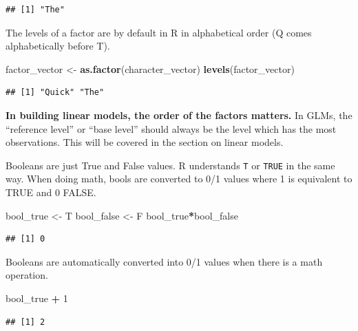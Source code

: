 \documentclass[]{book}
\newenvironment{Shaded}{\begin{snugshade}}{\end{snugshade}}
\newcommand{\DecValTok}[1]{\textcolor[rgb]{0.00,0.00,0.81}{#1}}
\newcommand{\KeywordTok}[1]{\textcolor[rgb]{0.13,0.29,0.53}{\textbf{#1}}}
\newcommand{\NormalTok}[1]{#1}
\newcommand{\OperatorTok}[1]{\textcolor[rgb]{0.81,0.36,0.00}{\textbf{#1}}}
\newcommand{\StringTok}[1]{\textcolor[rgb]{0.31,0.60,0.02}{#1}}
\begin{document}
\begin{verbatim}
## [1] "The"
\end{verbatim}

The levels of a factor are by default in R in alphabetical order (Q comes alphabetically before T).

\begin{Shaded}
\begin{Highlighting}[]
\NormalTok{factor_vector <-}\StringTok{ }\KeywordTok{as.factor}\NormalTok{(character_vector)}
\KeywordTok{levels}\NormalTok{(factor_vector)}
\end{Highlighting}
\end{Shaded}

\begin{verbatim}
## [1] "Quick" "The"
\end{verbatim}

\textbf{In building linear models, the order of the factors matters.} In GLMs, the ``reference level'' or ``base level'' should always be the level which has the most observations. This will be covered in the section on linear models.

Booleans are just True and False values. R understands \texttt{T} or \texttt{TRUE} in the same way. When doing math, bools are converted to 0/1 values where 1 is equivalent to TRUE and 0 FALSE.

\begin{Shaded}
\begin{Highlighting}[]
\NormalTok{bool_true <-}\StringTok{ }\NormalTok{T}
\NormalTok{bool_false <-}\StringTok{ }\NormalTok{F}
\NormalTok{bool_true}\OperatorTok{*}\NormalTok{bool_false}
\end{Highlighting}
\end{Shaded}

\begin{verbatim}
## [1] 0
\end{verbatim}

Booleans are automatically converted into 0/1 values when there is a math operation.

\begin{Shaded}
\begin{Highlighting}[]
\NormalTok{bool_true }\OperatorTok{+}\StringTok{ }\DecValTok{1}
\end{Highlighting}
\end{Shaded}

\begin{verbatim}
## [1] 2
\end{verbatim}
\end{document}
